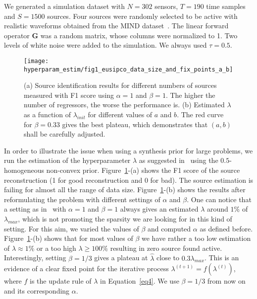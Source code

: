 We generated a simulation dataset with $N=302$ sensors, $T=190$ time samples and $S=1500$ sources. Four sources were randomly selected to be active with realistic waveforms obtained from the MIND dataset~\cite{weisend2007paving}. The linear forward operator $\mathbf{G}$ was a random matrix, whose columns were normalized to 1. Two levels of white noise were added to the simulation. We always used $\tau=0.5$.

\begin{figure}
	\texttt{[image: hyperparam\_estim/fig1\_eusipco\_data\_size\_and\_fix\_points\_a\_b]}
    \caption{(a) Source identification results for different numbers of sources measured with F1 score using $\alpha=1$ and $\beta=1$. The higher the number of regressors, the worse the performance is. (b) Estimated $\lambda$ as a function of $\lambda_{init}$ for different values of $a$ and $b$. The red curve for $\beta=0.33$ gives the best plateau, which demonstrates that $(a,b)$ shall be carefully adjusted.
    }
    \label{fig:fig1_eusipco}
\end{figure}

In order to illustrate the issue when using a synthesis prior for large problems, we run the estimation of the hyperparameter $\lambda$ as suggested in~\cite{Figueiredo} using the $0.5$-homogeneous non-convex prior. Figure~\ref{fig:fig1_eusipco}-(a) shows the F1 score of the source reconstruction (1 for good reconstruction and 0 for bad). The source estimation is failing for almost all the range of data size. Figure~\ref{fig:fig1_eusipco}-(b) shows the results after reformulating the problem with different settings of $\alpha$ and $\beta$. One can notice that a setting as in~\cite{Figueiredo} with $\alpha=1$ and $\beta=1$ always gives an estimated $\lambda$ around $1\%$ of $\lambda_{max}$, which is not promoting the sparsity we are looking for in this kind of setting. For this aim, we varied the values of $\beta$ and computed $\alpha$ as defined before. Figure~\ref{fig:fig1_eusipco}-(b) shows that for most values of $\beta$ we have rather a too low estimation of $\lambda\approx 1\%$ or a too high $\lambda\geq 100\%$ resulting in zero source found active. Interestingly, setting $\beta=1/3$ gives a plateau at $\hat{\lambda}$ close to $0.3\lambda_{max}$. This is an evidence of a clear fixed point for the iterative process $\lambda^{(t+1)}=f(\lambda^{(t)})$, where $f$ is the update rule of $\lambda$ in Equation~\eqref{eq4}. We use $\beta=1/3$ from now on and its corresponding $\alpha$.

